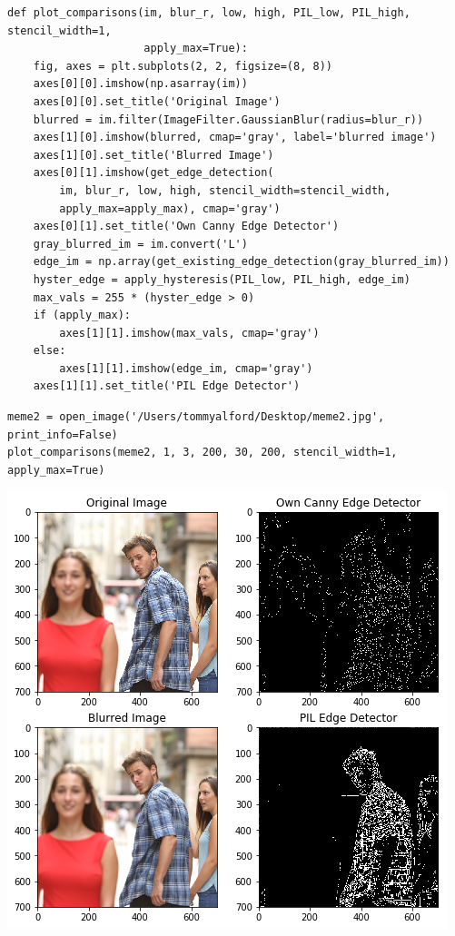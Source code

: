 \documentclass[11pt]{article}
\begin{document}
\begin{verbatim}
def plot_comparisons(im, blur_r, low, high, PIL_low, PIL_high, stencil_width=1,
                     apply_max=True):
    fig, axes = plt.subplots(2, 2, figsize=(8, 8))
    axes[0][0].imshow(np.asarray(im))
    axes[0][0].set_title('Original Image')
    blurred = im.filter(ImageFilter.GaussianBlur(radius=blur_r))
    axes[1][0].imshow(blurred, cmap='gray', label='blurred image')
    axes[1][0].set_title('Blurred Image')
    axes[0][1].imshow(get_edge_detection(
        im, blur_r, low, high, stencil_width=stencil_width,
        apply_max=apply_max), cmap='gray')
    axes[0][1].set_title('Own Canny Edge Detector')
    gray_blurred_im = im.convert('L')
    edge_im = np.array(get_existing_edge_detection(gray_blurred_im))
    hyster_edge = apply_hysteresis(PIL_low, PIL_high, edge_im)
    max_vals = 255 * (hyster_edge > 0)
    if (apply_max):
        axes[1][1].imshow(max_vals, cmap='gray')
    else:
        axes[1][1].imshow(edge_im, cmap='gray')
    axes[1][1].set_title('PIL Edge Detector')
\end{verbatim}


\begin{verbatim}
meme2 = open_image('/Users/tommyalford/Desktop/meme2.jpg', print_info=False)
plot_comparisons(meme2, 1, 3, 200, 30, 200, stencil_width=1, apply_max=True)
\end{verbatim}

\includegraphics[width=.9\linewidth]{./obipy-resources/333nyT.png}
\end{document}
